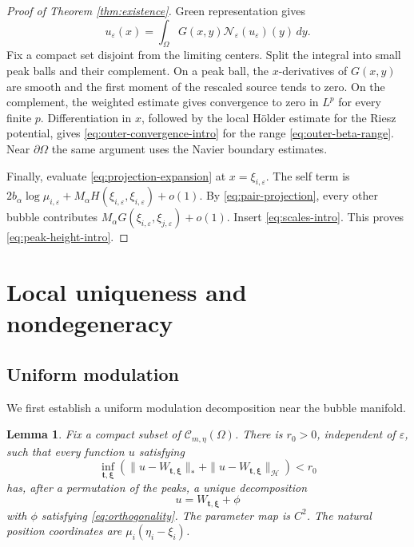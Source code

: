 \documentclass[11pt]{article}
\newtheorem{lemma}[theorem]{Lemma}
\numberwithin{equation}{section}
\begin{document}
\begin{proof}[Proof of Theorem \ref{thm:existence}]
Green representation gives
\begin{equation*}
u_\varepsilon(x)
=\int_\Omega
G(x,y)\mathcal N_\varepsilon(u_\varepsilon)(y)\,dy.
\end{equation*}
Fix a compact set disjoint from the limiting centers. Split the
integral into small peak balls and their complement. On a peak ball,
the $x$-derivatives of $G(x,y)$ are smooth and the first moment of the
rescaled source tends to zero. On the complement, the weighted
estimate gives convergence to zero in $L^p$ for every finite $p$.
Differentiation in $x$, followed by the local Hölder estimate for the
Riesz potential, gives \eqref{eq:outer-convergence-intro} for the
range \eqref{eq:outer-beta-range}. Near $\partial\Omega$ the same
argument uses the Navier boundary estimates.

Finally, evaluate \eqref{eq:projection-expansion} at
$x=\xi_{i,\varepsilon}$. The self term is
$2b_\alpha\log\mu_{i,\varepsilon}
+M_\alpha H(\xi_{i,\varepsilon},\xi_{i,\varepsilon})+o(1)$.
By \eqref{eq:pair-projection}, every other bubble contributes
$M_\alpha G(\xi_{i,\varepsilon},\xi_{j,\varepsilon})+o(1)$.
Insert \eqref{eq:scales-intro}. This proves
\eqref{eq:peak-height-intro}.
\end{proof}

\section{Local uniqueness and nondegeneracy}

\subsection{Uniform modulation}

We first establish a uniform modulation decomposition near the bubble manifold.

\begin{lemma}\label{lem:modulation}
Fix a compact subset of $\mathcal C_{m,\eta}(\Omega)$. There is $r_0>0$, independent of $\varepsilon$, such that every function $u$ satisfying
\[
\inf_{\boldsymbol t,\boldsymbol\xi}
\left(\|u-W_{\boldsymbol t,\boldsymbol\xi}\|_*
+\|u-W_{\boldsymbol t,\boldsymbol\xi}\|_\mathcal H\right)<r_0
\]
has, after a permutation of the peaks, a unique decomposition
\[
u=W_{\boldsymbol t,\boldsymbol\xi}+\phi
\]
with $\phi$ satisfying \eqref{eq:orthogonality}. The parameter map is $C^2$. The natural position coordinates are
$\mu_i(\eta_i-\xi_i)$.
\end{lemma}
\end{document}
